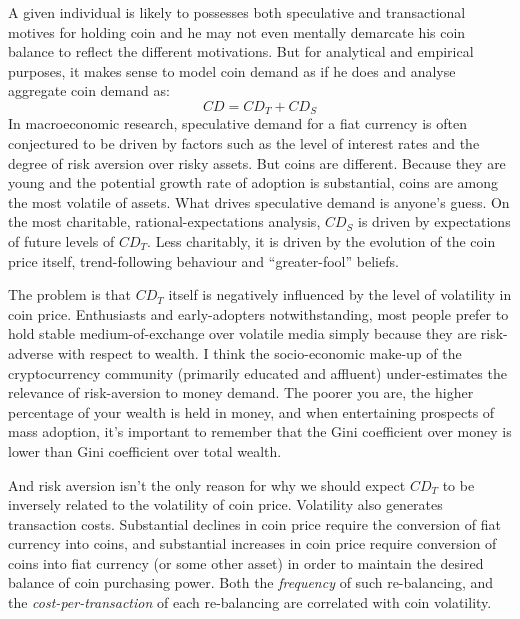 \documentclass[twocolumn]{article}
\begin{document}
A given individual is likely to possesses both speculative and
transactional motives for holding coin and he may not even mentally
demarcate his coin balance to reflect the different motivations. But
for analytical and empirical purposes, it makes sense to model coin
demand as if he does and analyse aggregate coin demand as:
\begin{equation}
CD = CD_{T} + CD_{S}
\end{equation}
In macroeconomic research, speculative demand for a fiat currency is
often conjectured to be driven by factors such as the level of
interest rates and the degree of risk aversion over risky assets. But
coins are different. Because they are young and the potential growth
rate of adoption is substantial, coins are among the most volatile of
assets. What drives speculative demand is anyone's guess. On the most
charitable, rational-expectations analysis, $CD_{S}$ is driven by
expectations of future levels of $CD_{T}$. Less charitably, it is
driven by the evolution of the coin price itself, trend-following
behaviour and ``greater-fool'' beliefs.

The problem is that $CD_{T}$ itself is negatively influenced by the
level of volatility in coin price. Enthusiasts and early-adopters
notwithstanding, most people prefer to hold stable medium-of-exchange
over volatile media simply because they are risk-adverse with respect
to wealth. I think the socio-economic make-up of the cryptocurrency
community (primarily educated and affluent) under-estimates the
relevance of risk-aversion to money demand. The poorer you are, the
higher percentage of your wealth is held in money, and when
entertaining prospects of mass adoption, it's important to remember
that the Gini coefficient over money is lower than Gini coefficient
over total wealth.

And risk aversion isn't the only reason for why we should expect
$CD_{T}$ to be inversely related to the volatility of coin
price. Volatility also generates transaction costs. Substantial
declines in coin price require the conversion of fiat currency into
coins, and substantial increases in coin price require conversion of
coins into fiat currency (or some other asset) in order to maintain
the desired balance of coin purchasing power. Both the
\emph{frequency} of such re-balancing, and the
\emph{cost-per-transaction} of each re-balancing are correlated with
coin volatility.
\end{document}
